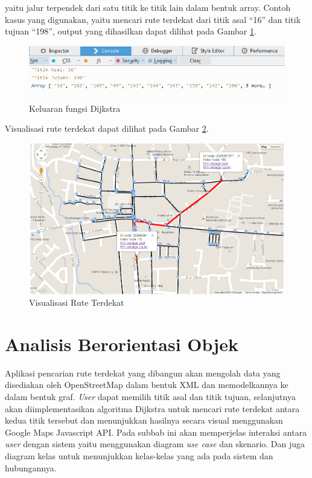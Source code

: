 yaitu jalur terpendek dari satu titik ke titik lain dalam bentuk array. Contoh
kasus yang digunakan, yaitu mencari rute terdekat dari titik asal ``16'' dan 
titik tujuan ``198'', output yang dihasilkan dapat dilihat pada Gambar
\ref{fig:output_dijkstra}.
\begin{figure}[h]
\centering
\includegraphics[scale=0.8]{Gambar/output_dijkstra}
\caption[Keluaran fungsi Dijkstra]{Keluaran fungsi Dijkstra}
\label{fig:output_dijkstra}
\end{figure}
Visualisasi rute terdekat dapat dilihat pada Gambar
\ref{fig:visualisasi_dijkstra}.
 \begin{figure}[h]
\centering
\includegraphics[scale=0.5]{Gambar/visualisasi_dijkstra}
\caption[visualisasi_dijkstra]{Visualisasi Rute Terdekat}
\label{fig:visualisasi_dijkstra}
\end{figure}

\section{Analisis Berorientasi Objek}
Aplikasi pencarian rute terdekat yang dibangun akan mengolah data yang
disediakan oleh OpenStreetMap dalam bentuk XML dan memodelkannya ke dalam bentuk graf. 
\textit{User} dapat memilih titik asal dan titik tujuan, selanjutnya akan
diimplementasikan algoritma Dijkstra untuk mencari rute terdekat antara kedua titik 
tersebut dan menunjukkan hasilnya secara visual menggunakan Google Maps
Javascript API.
Pada subbab ini akan memperjelas interaksi antara \textit{user} dengan
sistem yaitu menggunakan diagram \textit{use case} dan skenario. Dan juga
diagram kelas untuk menunjukkan kelas-kelas yang ada pada sistem dan
hubungannya.


